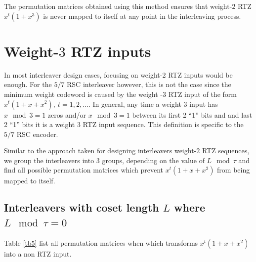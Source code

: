 \documentclass[11pt, oneside, dvipdfmx]{book}
\begin{document}

The permutation matrices obtained using this method ensures that weight-$2$ RTZ $x^t(1+x^3)$ is never mapped to itself at any point in the interleaving process.

 \section{Weight-$3$ RTZ inputs}
 In most interleaver design cases, focusing on weight-2 RTZ inputs would be enough. For the $5/7$ RSC interleaver however, this is not the case since the minimum weight codeword is caused by the weight -$3$ RTZ input of the form $x^t(1+x+x^2),~t=1,2,...$.  In general, any time a weight $3$ input has $x \mod 3=1$ zeros and/or $x \mod 3=1$ between its first 2 ``1'' bits and and last 2 ``1'' bits it is a weight $3$ RTZ input sequence. This definition is specific to the $5/7$ RSC encoder. 
 
 Similar to the approach taken for designing interleavers weight-$2$ RTZ sequences, we group the interleavers into 3 groups, depending on the value of $L \mod \tau$ and find all possible permutation matrices which prevent $x^t(1+x+x^2)$ from being mapped to itself.
 
 \subsection{Interleavers with coset length $L$ where $L \mod \tau =0$}
 Table \ref{tb5} list all permutation matrices when which transforms $x^t(1+x+x^2)$ into a non RTZ input.
 
\end{document}
